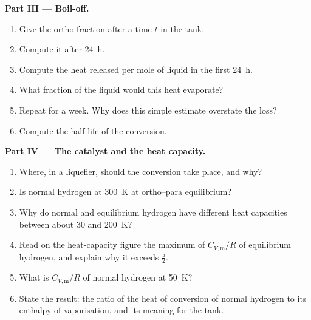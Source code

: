 \begin{problem}
\medskip\noindent\textbf{Part III --- Boil-off.}
\begin{enumerate}[resume]
  \item Give the ortho fraction after a time $t$ in the tank.
  \item Compute it after \qty{24}{h}.
  \item Compute the heat released per mole of liquid in the first \qty{24}{h}.
  \item What fraction of the liquid would this heat evaporate?
  \item Repeat for a week. Why does this simple estimate overstate the loss?
  \item Compute the half-life of the conversion.
\end{enumerate}

\medskip\noindent\textbf{Part IV --- The catalyst and the heat capacity.}
\begin{enumerate}[resume]
  \item Where, in a liquefier, should the conversion take place, and why?
  \item Is normal hydrogen at \qty{300}{K} at ortho--para equilibrium?
  \item Why do normal and equilibrium hydrogen have different heat capacities
        between about 30 and \qty{200}{K}?
  \item Read on the heat-capacity figure the maximum of $C_{V,\mathrm m}/R$ of equilibrium
        hydrogen, and explain why it exceeds $\frac52$.
  \item What is $C_{V,\mathrm m}/R$ of normal hydrogen at \qty{50}{K}?
  \item State the result: the ratio of the heat of conversion of normal hydrogen
        to its enthalpy of vaporisation, and its meaning for the tank.
\end{enumerate}
\end{problem}
